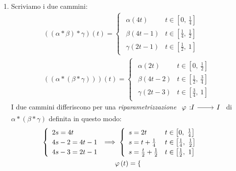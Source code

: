 \begin{demonstration}~{}
\begin{enumerate}[label=\Roman*]
	\item Scriviamo i due cammini:
	\begin{gather*}
\left(\left(\alpha\ast\beta\right)\ast\gamma\right)\left(t\right)=\begin{cases}
	\begin{array}{ll}
		\alpha\left(4t\right)&t\in\left[0,\ \frac{1}{4}\right]\\
		\beta\left(4t-1\right)&t\in\left[\frac{1}{4},\ \frac{1}{2}\right]\\
		\gamma\left(2t-1\right)&t\in\left[\frac{1}{2},\ 1\right]
	\end{array}
\end{cases}\\
\left(\left(\alpha\ast\left(\beta\ast\gamma\right)\right)\right)\left(t\right)=\begin{cases}
\begin{array}{ll}
	\alpha\left(2t\right)&t\in\left[0,\ \frac{1}{2}\right]\\
	\beta\left(4t-2\right)&t\in\left[\frac{1}{2},\ \frac{3}{4}\right]\\
	\gamma\left(2t-3\right)&t\in\left[\frac{3}{4},\ 1\right]
\end{array}
\end{cases}
	\end{gather*}
I due cammini differiscono per una \textit{riparametrizzazione} $\funz{\oldphi}{I}{I}$ di $\alpha\ast\left(\beta\ast\gamma\right)$ definita in questo modo:
\begin{gather*}
	\begin{cases}
		\begin{array}{l}
			2s=4t\\
			4s-2=4t-1\\
			4s-3=2t-1
		\end{array}
\implies
\begin{cases}
\begin{array}{ll}
	s=2t&t\in\left[0,\ \frac{1}{4}\right]\\
	s=t+\frac{1}{4}&t\in\left[\frac{1}{4},\ \frac{1}{2}\right]\\
	s=\frac{t}{2}+\frac{1}{2}&t\in\left[\frac{1}{2},\ 1\right]
\end{array}
		\end{cases}
	\end{cases}\\
\oldphi\left(t\right)=	\begin{cases}

\end{cases}
\end{gather*}
\end{enumerate}
\end{demonstration}
